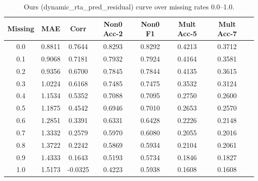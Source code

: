 \begin{table}[t]
\centering
\small
\begin{tabular}{cccccccc}
\toprule
Missing & MAE & Corr & Non0 Acc-2 & Non0 F1 & Mult Acc-5 & Mult Acc-7 \\
\midrule
0.0 & 0.8811 & 0.7644 & 0.8293 & 0.8292 & 0.4213 & 0.3712 \\
0.1 & 0.9068 & 0.7181 & 0.7932 & 0.7924 & 0.4164 & 0.3581 \\
0.2 & 0.9356 & 0.6700 & 0.7845 & 0.7844 & 0.4135 & 0.3615 \\
0.3 & 1.0224 & 0.6168 & 0.7485 & 0.7475 & 0.3532 & 0.3124 \\
0.4 & 1.1534 & 0.5352 & 0.7088 & 0.7095 & 0.2750 & 0.2600 \\
0.5 & 1.1875 & 0.4542 & 0.6946 & 0.7010 & 0.2653 & 0.2570 \\
0.6 & 1.2851 & 0.3391 & 0.6331 & 0.6428 & 0.2226 & 0.2148 \\
0.7 & 1.3332 & 0.2579 & 0.5970 & 0.6080 & 0.2055 & 0.2016 \\
0.8 & 1.3722 & 0.2242 & 0.5869 & 0.5934 & 0.2104 & 0.2061 \\
0.9 & 1.4333 & 0.1643 & 0.5193 & 0.5734 & 0.1846 & 0.1827 \\
1.0 & 1.5173 & -0.0325 & 0.4223 & 0.5938 & 0.1608 & 0.1608 \\
\bottomrule
\end{tabular}
\caption{Ours (dynamic\_rta\_pred\_residual) curve over missing rates 0.0--1.0.}
\label{tab:ours_curve_00_10}
\end{table}